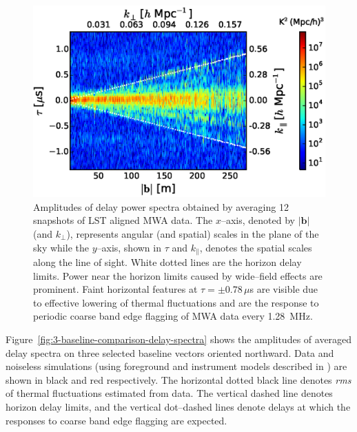 \documentclass[preprint2,apjl,numberedappendix,twocolappendix,appendixfloats]{emulateapj}
\begin{document}
\begin{figure}[htb]
\centering
\includegraphics[width=\linewidth]{multi_baseline_CLEAN_fhd_avg_visibilities_amplitudes_185.0_MHz_30.7_MHz.eps}
\caption{Amplitudes of delay power spectra obtained by averaging 12 snapshots of LST aligned MWA data. The $x$--axis, denoted by $|\boldsymbol{b}|$ (and $k_\perp$), represents angular (and spatial) scales in the plane of the sky while the $y$--axis, shown in $\tau$ and $k_\parallel$, denotes the spatial scales along the line of sight. White dotted lines are the horizon delay limits. Power near the horizon limits caused by wide--field effects are prominent. Faint horizontal features at $\tau=\pm 0.78\,\mu$s are visible due to effective lowering of thermal fluctuations and are the response to periodic coarse band edge flagging of MWA data every 1.28~MHz. \label{fig:avg-fhd-delay-spectra}}
\end{figure}

Figure~\ref{fig:3-baseline-comparison-delay-spectra} shows the amplitudes of averaged delay spectra on three selected baseline vectors oriented northward. Data and noiseless simulations (using foreground and instrument models described in \citet{thy15}) are shown in black and red respectively. The horizontal dotted black line denotes {\it rms} of thermal fluctuations estimated from data. The vertical dashed line denotes horizon delay limits, and the vertical dot--dashed lines denote delays at which the responses to coarse band edge flagging are expected.
\end{document}
